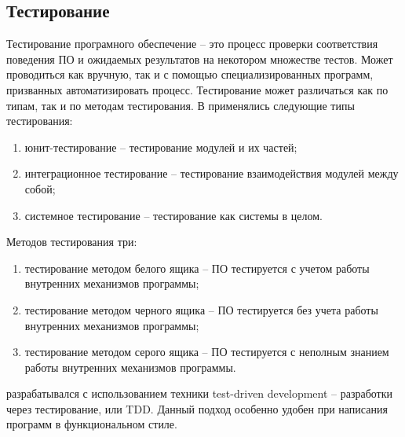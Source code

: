 \subsection{Тестирование {\ProgModule}}\label{sec:ch3/sec1/sub2}
Тестирование програмного обеспечение -- это процесс проверки соответствия поведения 
ПО и ожидаемых результатов на некотором множестве тестов. Может проводиться как вручную,
так и с помощью специализированных программ, призванных автоматизировать процесс.
Тестирование может различаться как по типам, так и по методам тестирования.
В {\ProgModule} применялись следующие типы тестирования:
\begin{enumerate}[label={\arabic*)}]
    \item юнит-тестирование -- тестирование модулей {\ProgModule} и их частей;
    \item интеграционное тестирование -- тестирование взаимодействия модулей
        {\ProgModule} между собой;
    \item системное тестирование -- тестирование {\ProgModule} как системы в целом.
\end{enumerate}
Методов тестирования три:
\begin{enumerate}[label={\arabic*)}]
    \item тестирование методом белого ящика -- ПО тестируется с учетом
        работы внутренних механизмов программы;
    \item тестирование методом черного ящика -- ПО тестируется без учета
        работы внутренних механизмов программы;
    \item тестирование методом серого ящика -- ПО тестируется с неполным знанием
        работы внутренних механизмов программы.
\end{enumerate}

{\ProgModule} разрабатывался с использованием техники test-driven development \autocite{TDD} 
-- разработки через тестирование, или TDD.
Данный подход особенно удобен при написания программ в функциональном стиле.

